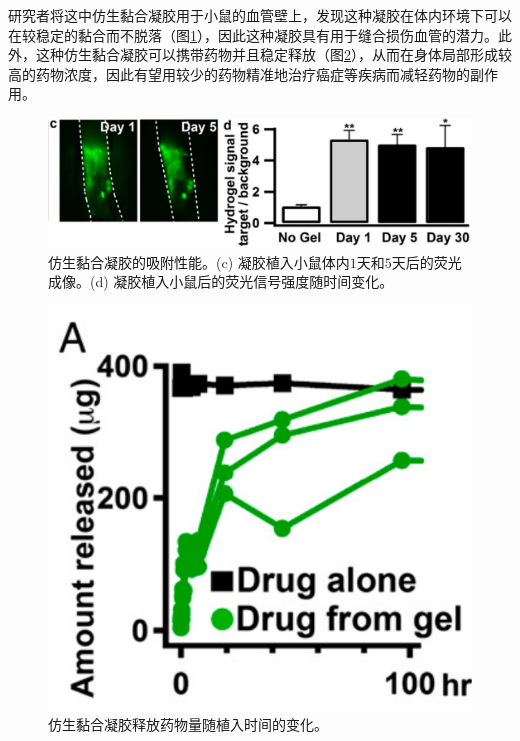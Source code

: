 \documentclass{assignment}
\begin{document}
\begin{da}
\begin{itemize}
        研究者将这中仿生黏合凝胶用于小鼠的血管壁上，发现这种凝胶在体内环境下可以在较稳定的黏合而不脱落（图\ref{Bio-Adhesive-1}），因此这种凝胶具有用于缝合损伤血管的潜力。此外，这种仿生黏合凝胶可以携带药物并且稳定释放（图\ref{Bio-Adhesive-2}），从而在身体局部形成较高的药物浓度，因此有望用较少的药物精准地治疗癌症等疾病而减轻药物的副作用。
        \begin{figure}[H]
            \centering
            \includegraphics[width=.5\columnwidth]{Bio-Adhesive-1.png}
            \caption{仿生黏合凝胶的吸附性能\cite{kastrup2012painting}。(c) 凝胶植入小鼠体内$1$天和$5$天后的荧光成像。(d) 凝胶植入小鼠后的荧光信号强度随时间变化。}
            \label{Bio-Adhesive-1}
        \end{figure}
        \begin{figure}[H]
            \centering
            \includegraphics[width=.5\columnwidth]{Bio-Adhesive-2.png}
            \caption{仿生黏合凝胶释放药物量随植入时间的变化\cite{kastrup2012painting}。}
            \label{Bio-Adhesive-2}
        \end{figure}
    \end{itemize}
\end{da}
\end{document}
